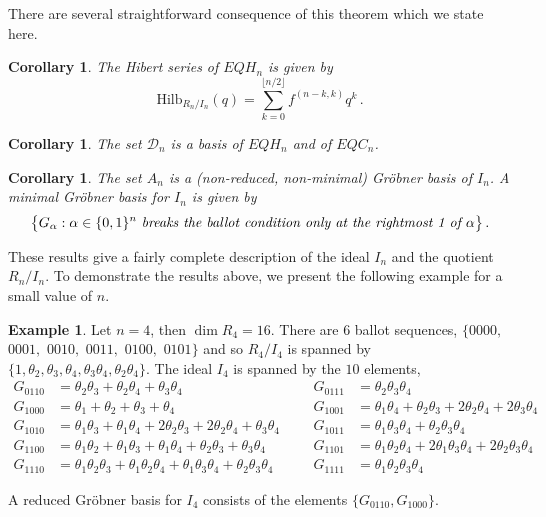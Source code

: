 \documentclass[submission]{FPSAC2023}
\newtheorem{cor}[theorem]{Corollary}
\theoremstyle{definition}
\newtheorem{example}[theorem]{Example}
\numberwithin{equation}{section}
\begin{document}
There are several straightforward consequence of this theorem which we state here.

\begin{cor}\label{cor:hilb}  The Hibert series of $EQH_{n}$ is given by
$$\text{Hilb}_{R_n/I_n}(q) = \sum_{k=0}^{\lfloor{n/2}\rfloor} f^{(n-k,k)} q^k\,.$$
\end{cor}

\begin{cor} The set ${\mathcal D}_n$ is a basis of $EQH_n$ and of $EQC_n$.
\end{cor}

\begin{cor}\label{cor:minimalGB}
The set $A_n$ is a (non-reduced, non-minimal) Gr\"obner basis of $I_n$. A minimal Gr\"obner basis for $I_n$ is given by
$$ \big\{ G_\alpha : \alpha \in \{0,1\}^n \text{ \it breaks the ballot condition only
at the rightmost  1 of }  \alpha\big\}\,.
$$
\end{cor}

These results give a fairly complete description of the ideal $I_n$ and the quotient $R_n/I_n$.
To demonstrate the results above, we present the following example for a small value of $n$.

\begin{example} Let $n=4$, then $\dim R_4 = 16$.  There are $6$ ballot sequences,
$\{ 0000,$ $0001,$ $0010,$ $0011,$ $0100,$ $0101 \}$ and so $R_4/I_4$ is spanned by
$\{ 1, \theta_2, \theta_3, \theta_4,  \theta_3 \theta_4, \theta_2 \theta_4 \}$.
The ideal $I_4$ is spanned by the $10$ elements,
\begin{align*}
G_{0110} &= \theta_2 \theta_3 + \theta_2 \theta_4 + \theta_3 \theta_4&&&
G_{0111} &= \theta_2 \theta_3 \theta_4\\
G_{1000} &= \theta_1 + \theta_2 + \theta_3 + \theta_4&&&
G_{1001} &= \theta_1 \theta_4 + \theta_2 \theta_3 +2 \theta_2 \theta_4 + 2 \theta_3 \theta_4\\
G_{1010} &= \theta_1 \theta_3+ \theta_1 \theta_4 + 2 \theta_2 \theta_3  + 2 \theta_2 \theta_4 + \theta_3 \theta_4&&&
G_{1011} &= \theta_1 \theta_3 \theta_4 + \theta_2 \theta_3 \theta_4\\
G_{1100} &= \theta_1 \theta_2 + \theta_1 \theta_3 + \theta_1 \theta_4 + \theta_2 \theta_3 + \theta_3 \theta_4&&&
G_{1101} &= \theta_1 \theta_2 \theta_4 + 2 \theta_1 \theta_3 \theta_4 + 2 \theta_2 \theta_3 \theta_4\\
G_{1110} &= \theta_1 \theta_2 \theta_3 + \theta_1 \theta_2 \theta_4 + \theta_1 \theta_3 \theta_4 + \theta_2 \theta_3 \theta_4&&&
G_{1111} &= \theta_1 \theta_2 \theta_3 \theta_4
\end{align*}

A reduced Gr\"obner basis for $I_4$ consists of the elements $\{ G_{0110}, G_{1000} \}$.
\end{example}


\printbibliography 
\end{document}
